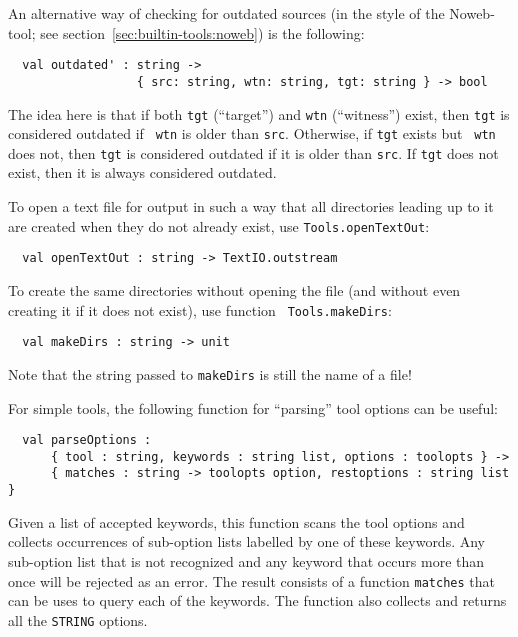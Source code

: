 An alternative way of checking for outdated sources (in the style of
the Noweb-tool; see section~\ref{sec:builtin-tools:noweb}) is the
following:

\begin{verbatim}
  val outdated' : string ->
                  { src: string, wtn: string, tgt: string } -> bool
\end{verbatim}

The idea here is that if both {\tt tgt} (``target'') and {\tt wtn}
(``witness'') exist, then {\tt tgt} is considered outdated if {\tt
wtn} is older than {\tt src}.  Otherwise, if {\tt tgt} exists but {\tt
wtn} does not, then {\tt tgt} is considered outdated if it is older
than {\tt src}.  If {\tt tgt} does not exist, then it is always
considered outdated.

  To open a text file for
output in such a way that all directories leading up to it are created
when they do not already exist, use {\tt Tools.openTextOut}:

\begin{verbatim}
  val openTextOut : string -> TextIO.outstream
\end{verbatim}

To create the same directories without opening the file (and without
even creating it if it does not exist), use function {\tt
Tools.makeDirs}:

\begin{verbatim}
  val makeDirs : string -> unit
\end{verbatim}

Note that the string passed to {\tt makeDirs} is still the name of a
file!

  For simple tools, the following
function for ``parsing'' tool options can be useful:

\begin{verbatim}
  val parseOptions :
      { tool : string, keywords : string list, options : toolopts } ->
      { matches : string -> toolopts option, restoptions : string list }
\end{verbatim}

Given a list of accepted keywords, this function scans the tool
options and collects occurrences of sub-option lists labelled by one
of these keywords.  Any sub-option list that is not recognized and any
keyword that occurs more than once will be rejected as an error.  The
result consists of a function {\tt matches} that can be uses to query
each of the keywords.  The function also collects and returns all the
{\tt STRING} options.


